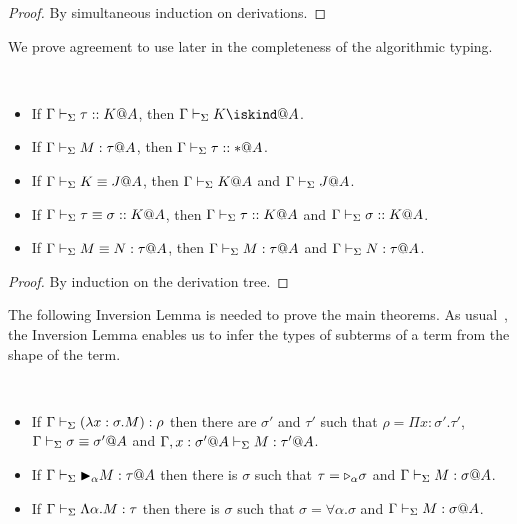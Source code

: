 \begin{proof}
    By simultaneous induction on derivations.
\end{proof}


We prove agreement to use later in the completeness of the algorithmic typing.

\begin{lemma}[Agreement]\
    \label{lemma:Agreement}
    \begin{itemize}
        \item If \(\Gamma\vdash_\Sigma \tau::K@A\), then \(\G\V K \iskind@A \).
        \item If \(\G\V M:\tau@A\), then \(\Gamma\vdash_\Sigma \tau::*@A\).
        \item If \(\Gamma\vdash_\Sigma K\equiv J@A\), then \(\Gamma\vdash_\Sigma K @A\) and \(\Gamma\vdash_\Sigma J @A\).
        \item If \(\Gamma\vdash_\Sigma \tau\equiv \sigma :: K@A\), then \(\Gamma\vdash_\Sigma \tau::K@A\) and \(\Gamma\vdash_\Sigma \sigma::K@A\).
        \item If \(\G\V M\E N : \tau@A\), then \(\G\V M:\tau@A\) and \(\G\V N:\tau@A\).
    \end{itemize}
\end{lemma}
\begin{proof}
    By induction on the derivation tree.
\end{proof}



The following Inversion Lemma is needed to prove the main theorems.  As
usual~\cite{TAPL}, the Inversion Lemma enables us to infer the types of
subterms of a term from the shape of the term.

\begin{lemma}[Inversion]\ 
	\begin{itemize}
		\item If $\Gamma \vdash_\Sigma (\lambda x:\sigma.M) : \rho$ then there are $\sigma'$ and $\tau'$ such that
		      $\rho = \Pi x:\sigma'.\tau'$, $\Gamma \vdash_\Sigma \sigma \equiv \sigma'@A$ and $\Gamma ,x:\sigma'@A\vdash_\Sigma M:\tau'@A$.
		\item If $\G \V \TB_\alpha M : \tau@A$ then 
		      there is $\sigma$ such that $\tau = {\mathop{\triangleright}}_\alpha \sigma$ and $\G \V M : \sigma@A$.
		  \item If $\Gamma \vdash_\Sigma \Lambda\alpha.M : \tau$ then 
		  there is $\sigma$ such that $\sigma = \forall\alpha.\sigma$ and $\G \V M : \sigma@A$.%
	\end{itemize}
\end{lemma}

